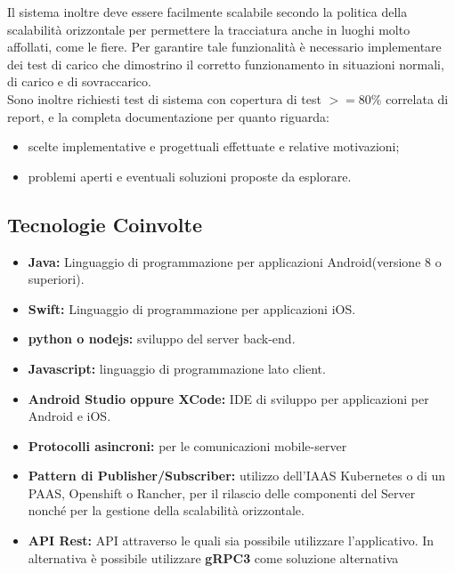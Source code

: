 	Il sistema inoltre deve essere facilmente scalabile secondo la politica della scalabilità orizzontale per permettere la tracciatura anche in luoghi molto affollati, come le fiere. Per garantire tale funzionalità è necessario implementare dei test di carico che dimostrino il corretto funzionamento in situazioni normali, di carico e di sovraccarico.\\
	Sono inoltre richiesti test di sistema con copertura di test $>=80\%$ correlata di report, e la completa documentazione per quanto riguarda:
	\begin{itemize}
		\item scelte implementative e progettuali effettuate e relative motivazioni;
		\item problemi aperti e eventuali soluzioni proposte da esplorare. 
	\end{itemize}
	\subsection{Tecnologie Coinvolte}
	\begin{itemize}
		\item \textbf{Java:} Linguaggio di programmazione per applicazioni Android(versione 8 o superiori).
		\item \textbf{Swift:} Linguaggio di programmazione per applicazioni iOS.
		\item \textbf{python o nodejs:} sviluppo del server back-end.
		\item \textbf{Javascript:} linguaggio di programmazione lato client.
		\item \textbf{Android Studio oppure XCode:} IDE di sviluppo per applicazioni per Android e iOS.
		\item \textbf{Protocolli asincroni:} per le comunicazioni mobile-server
		\item \textbf{Pattern di Publisher/Subscriber:} utilizzo dell’IAAS Kubernetes o di un PAAS, Openshift o Rancher, per il rilascio delle componenti del Server nonché per la gestione della scalabilità orizzontale.
		\item \textbf{API Rest:} API attraverso le quali sia possibile utilizzare l'applicativo. In alternativa è possibile utilizzare \textbf{gRPC3} come soluzione alternativa
	\end{itemize}
	
